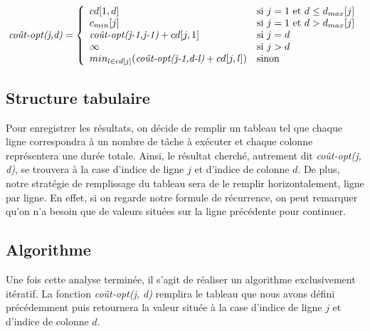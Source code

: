 \documentclass[a4paper, titlepage]{article}
\begin{document}
		$$
		\mbox{\emph{coût-opt(j,d)}} = \left\{
		    \begin{array}{ll}
		        cd[1,d] & \mbox{si } j=1 \mbox{ et } d \le d_{max}[j] \\
		        c_{min}[j] & \mbox{si } j=1 \mbox{ et } d > d_{max}[j] \\
		        \mbox{\emph{coût-opt(j-1,j-1)}} + cd[j,1] & \mbox{si } j=d \\
		        \infty & \mbox{si } j>d \\
		        min_{l \in cd[j]}(\mbox{\emph{coût-opt(j-1,d-l)}} + cd[j,l]) & \mbox{sinon} \\
		    \end{array}
		\right.
		$$
		
	\subsection{Structure tabulaire}
		Pour enregistrer les résultats, on décide de remplir un tableau tel que chaque ligne correspondra à un nombre de tâche à exécuter et chaque colonne représentera une durée totale.
		Ainsi, le résultat cherché, autrement dit \emph{coût-opt(j, d)}, se trouvera à la case d'indice de ligne $j$ et d'indice de colonne $d$.
		De plus, notre stratégie de remplissage du tableau sera de le remplir horizontalement, ligne par ligne.
		En effet, si on regarde notre formule de récurrence, on peut remarquer qu'on n'a besoin que de valeurs situées sur la ligne précédente pour continuer.
	
	\subsection{Algorithme}
		Une fois cette analyse terminée, il s'agit de réaliser un algorithme exclusivement itératif.
		La fonction \emph{coût-opt(j, d)} remplira le tableau que nous avons défini précédemment puis retournera la valeur située à la case d'indice de ligne $j$ et d'indice de colonne $d$.
		
\end{document}
